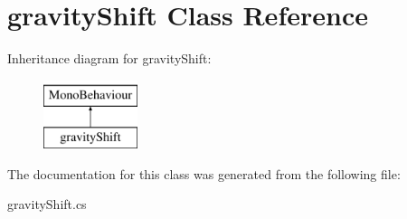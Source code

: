 \hypertarget{classgravity_shift}{}\section{gravity\+Shift Class Reference}
\label{classgravity_shift}
Inheritance diagram for gravity\+Shift\+:\begin{figure}[H]
\begin{center}
\leavevmode
\includegraphics[height=2.000000cm]{classgravity_shift}
\end{center}
\end{figure}


The documentation for this class was generated from the following file\+:\begin{DoxyCompactItemize}
\item 
gravity\+Shift.\+cs\end{DoxyCompactItemize}
